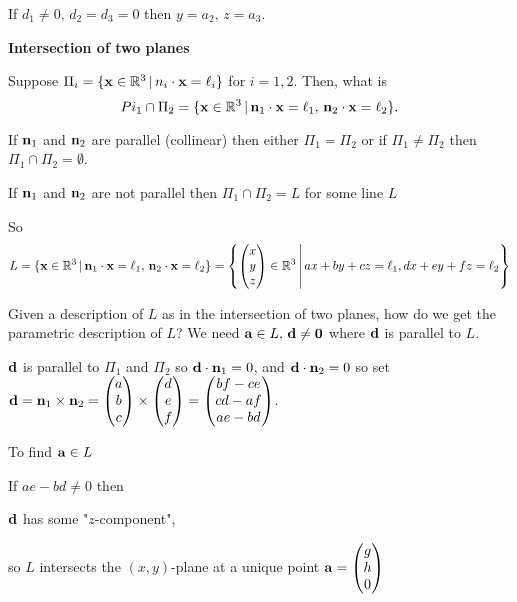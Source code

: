 \documentclass[10pt, a4paper]{article}
\begin{document}
If $d_1 \neq 0,\,d_2 = d_3 = 0$ then $y = a_2,\, z = a_3$.


\textbf{Intersection of two planes}

Suppose $\Pi_i = \{\mathbf{x} \in \mathbb{R} ^ 3 \,|\, n_i \cdot \mathbf{x} = \ell_i\}$ for $i = 1, 2$. Then, what is
\[
Pi_1 \cap \Pi_2 = \{\mathbf{x}\in \mathbb{R} ^ 3 \,|\, \mathbf{n}_1 \cdot \mathbf{x} = \ell_1,\,\mathbf{n}_2 \cdot \mathbf{x} = \ell_2\}.
\]

If $\mathbf{n}_1$ and $\mathbf{n}_2$ are parallel (collinear) then either $\Pi_1 = \Pi_2$ or if $\Pi_1 \neq \Pi_2$ then $\Pi_1 \cap \Pi_2 = \emptyset$.

If $\mathbf{n}_1$ and $\mathbf{n}_2$ are not parallel then $\Pi_1 \cap \Pi_2 = L$ for some line $L$

So 
\[L = \{\mathbf{x}\in \mathbb{R} ^ 3 \,|\, \mathbf{n}_1 \cdot \mathbf{x} = \ell_1,\,\mathbf{n}_2 \cdot \mathbf{x} = \ell_2\} = \left\{\begin{pmatrix}
    x \\ y \\ z
\end{pmatrix} \in \mathbb{R} ^ 3\, \middle|\,
    ax + by + cz = \ell_1,
    dx + ey + fz = \ell_2
\right\}
\]

Given a description of $L$ as in the intersection of two planes, how do we get the parametric description of $L$?
We need $\mathbf{a} \in L,\,\mathbf{d \neq 0}$ where $\mathbf{d}$ is parallel to $L$.

$\mathbf{d}$ is parallel to $\Pi_1$ and $\Pi_2$ so $\mathbf{d} \cdot \mathbf{n}_1 = 0$, and $\mathbf{d} \cdot \mathbf{n}_2 = 0$ so set $\mathbf{d} = \mathbf{n}_1 \times \mathbf{n}_2 = \begin{pmatrix}
    a \\ b \\ c
\end{pmatrix} \times \begin{pmatrix}
    d \\ e \\ f
\end{pmatrix} = \begin{pmatrix}
    bf - ce \\
    cd - af \\
    ae - bd
\end{pmatrix}$.

To find $\mathbf{a} \in L$

If $ae - bd \neq 0$ then

$\mathbf{d}$ has some "$z$-component",

so $L$ intersects the $(x, y)$-plane at a unique point $\mathbf{a} = \begin{pmatrix}
    g \\ h \\ 0
\end{pmatrix}$
\end{document}
